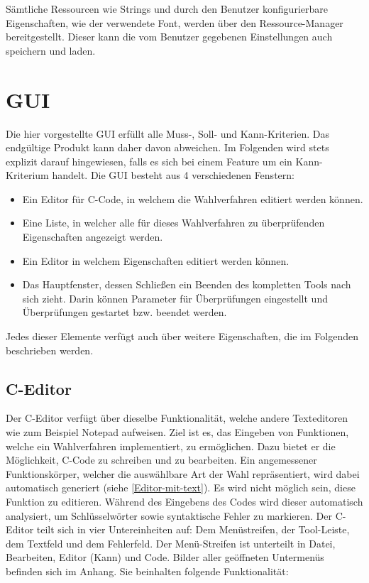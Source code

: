 \documentclass[a4paper]{scrreprt}
\begin{document}
Sämtliche Ressourcen wie Strings und durch den Benutzer konfigurierbare Eigenschaften, wie der verwendete Font, werden über den Ressource-Manager bereitgestellt. Dieser kann die vom Benutzer gegebenen Einstellungen auch speichern und laden.

\chapter{GUI}
Die hier vorgestellte \ac{GUI} erfüllt alle Muss-, Soll- und Kann-Kriterien. Das endgültige Produkt kann daher davon abweichen. Im Folgenden wird stets explizit darauf hingewiesen, falls es sich bei einem Feature um ein Kann-Kriterium handelt.
Die \ac{GUI} besteht aus 4 verschiedenen Fenstern: 
\begin{itemize}
\item Ein Editor für C-Code, in welchem die Wahlverfahren editiert werden können.
\item Eine Liste, in welcher alle für dieses Wahlverfahren zu überprüfenden Eigenschaften angezeigt werden.
\item Ein Editor in welchem Eigenschaften editiert werden können.
\item Das Hauptfenster, dessen Schließen ein Beenden des kompletten Tools nach sich zieht. Darin können Parameter für Überprüfungen eingestellt und Überprüfungen gestartet bzw. beendet werden.
\end{itemize}
Jedes dieser Elemente verfügt auch über weitere Eigenschaften, die im Folgenden beschrieben werden.

\section{C-Editor}
Der C-Editor verfügt über dieselbe Funktionalität, welche andere Texteditoren wie zum Beispiel Notepad aufweisen. Ziel ist es, das Eingeben von Funktionen, welche ein Wahlverfahren implementiert, zu ermöglichen. Dazu bietet er die Möglichkeit, C-Code zu schreiben und zu bearbeiten. Ein angemessener Funktionskörper, welcher die auswählbare Art der Wahl repräsentiert, wird dabei automatisch generiert (siehe \ref{Editor-mit-text}). Es wird nicht möglich sein, diese Funktion zu editieren. Während des Eingebens des Codes wird dieser automatisch analysiert, um Schlüsselwörter sowie syntaktische Fehler zu markieren. 
Der C-Editor teilt sich in vier Untereinheiten auf: Dem Menüstreifen, der Tool-Leiste, dem Textfeld und dem Fehlerfeld. Der Menü-Streifen ist unterteilt in Datei, Bearbeiten, Editor (Kann) und Code. Bilder aller geöffneten Untermenüs befinden sich im Anhang. Sie beinhalten folgende Funktionalität:
\end{document}
